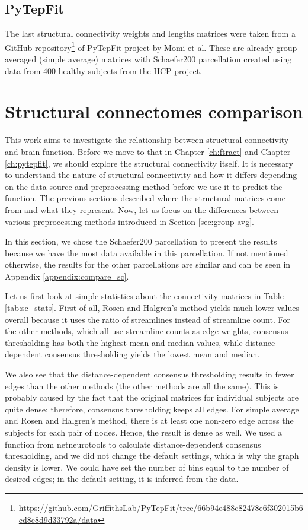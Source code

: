 \subsection{PyTepFit}

The last structural connectivity weights and lengths matrices were taken from a GitHub repository\footnote{\url{https://github.com/GriffithsLab/PyTepFit/tree/66b94e488c82478e6f302015b6cd8e8d9d33792a/data}} of PyTepFit project by Momi et al\cite{momi_tms-evoked_2023}. These are already group-averaged (simple average) matrices with Schaefer200 parcellation created using data from 400 healthy subjects from the HCP project. 

\section{Structural connectomes comparison}

This work aims to investigate the relationship between structural connectivity and brain function. Before we move to that in Chapter \ref{ch:ftract} and Chapter \ref{ch:pytepfit}, we should explore the structural connectivity itself. It is necessary to understand the nature of structural connectivity and how it differs depending on the data source and preprocessing method before we use it to predict the function. The previous sections described where the structural matrices come from and what they represent. Now, let us focus on the differences between various preprocessing methods introduced in Section \ref{sec:group-avg}.

In this section, we chose the Schaefer200 parcellation to present the results because we have the most data available in this parcellation. If not mentioned otherwise, the results for the other parcellations are similar and can be seen in Appendix \ref{appendix:compare_sc}.

Let us first look at simple statistics about the connectivity matrices in Table \ref{tab:sc_stats}. First of all, Rosen and Halgren's method yields much lower values overall because it uses the ratio of streamlines instead of streamline count. For the other methods, which all use streamline counts as edge weights, consensus thresholding has both the highest mean and median values, while distance-dependent consensus thresholding yields the lowest mean and median.

We also see that the distance-dependent consensus thresholding results in fewer edges than the other methods (the other methods are all the same). This is probably caused by the fact that the original matrices for individual subjects are quite dense; therefore, consensus thresholding keeps all edges. For simple average and Rosen and Halgren's method, there is at least one non-zero edge across the subjects for each pair of nodes. Hence, the result is dense as well. We used a function from netneurotools to calculate distance-dependent consensus thresholding, and we did not change the default settings, which is why the graph density is lower. We could have set the number of bins equal to the number of desired edges; in the default setting, it is inferred from the data.

